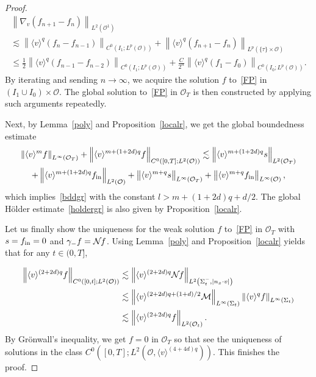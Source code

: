 \documentclass[AHL,Unicode,longabstracts,published]{cedram}
\newcommand*\fin {f_{\rm in}}
\newcommand*\M {{\mathcal{M}}}
\newcommand*\NN {{\mathcal{N}\hspace{-.3mm}}}
\newcommand*\OO {\mathcal{O}}
\newcommand{\lv}{\langle v\rangle}
\begin{document}
\begin{proof}
\begin{multline*}
\left\|\nabla_v(f_{n+1}-f_{n})\right\|_{L^2\left(\OO^1\right)} \\
\lesssim \left\|\lv^{q}(f_{n}-f_{n-1})\right\|_{C^0\left(I_1;L^p(\OO)\right)} +\left\|\lv^{q}(f_{n+1}-f_{n})\right\|_{L^p(\{\tau\}\times\OO)} \\
\le \frac{1}{2}\left\|\lv^{q} \left(f_{n-1}-f_{n-2}\right)\right\|_{C^0\left(I_1;L^p(\OO)\right)} + \frac{C}{2^n}\left\|\lv^{q} (f_{1}-f_{0})\right\|_{C^0\left(I_{0};L^p(\OO)\right)} .
\end{multline*}
By iterating and sending $n\rightarrow\infty$, we acquire the solution $f$ to~\eqref{FP} in $(I_1\cup I_0)\times\OO$. The global solution to~\eqref{FP} in $\OO_T$ is then constructed by applying such arguments repeatedly.

Next, by Lemma~\ref{poly} and Proposition~\ref{localr}, we get the global boundedness estimate
\begin{multline*}
\left\|\lv^mf\right\|_{L^\infty(\OO_T)} +\left\|\lv^{m+(1+2d)q}f\right\|_{C^0\left([0,T];L^2(\OO)\right)}
\lesssim \left\|\lv^{m+(1+2d)q}s\right\|_{L^2(\OO_T)}\\
+ \left\|\lv^{m+(1+2d)q}\fin\right\|_{L^2(\OO)} +
\left\|\lv^{m+q}s\right\|_{L^\infty(\OO_T)} + \left\|\lv^{m+q}\fin\right\|_{L^\infty(\OO)},
\end{multline*}
which implies~\eqref{bddgr} with the constant $l>m+(1+2d)q+d/2$. The global H\"older estimate~\eqref{holdergr} is also given by Proposition~\ref{localr}.

Let us finally show the uniqueness for the weak solution $f$ to~\eqref{FP} in $\OO_T$ with $s=\fin=0$ and $\gamma_-f=\NN f$. Using Lemma~\ref{poly} and Proposition~\ref{localr} yields that for any $t\in(0,T]$,

\begin{align*}
\left\|\lv^{(2+2d)q} f\right\|_{C^0\left([0,t];L^2(\OO)\right)}
&\lesssim \left\|\lv^{(2+2d)q}\NN f\right\|_{L^2\left(\Sigma_t^-,|n_x\cdot v|\right)}\\
&\lesssim \left\|\lv^{(2+2d)q+(1+d)/2}\M\right\|_{L^\infty(\Sigma_t)} \left\|\lv^{q}f\right\|_{L^\infty(\Sigma_t)}\\
&\lesssim \left\|\lv^{(2+2d)q} f\right\|_{L^2(\OO_t)}.
\end{align*}
By Gr\"onwall's inequality, we get $f=0$ in $\OO_T$ so that see the uniqueness of solutions in the class $C^0([0,T];L^2(\OO,\lv^{(4+4d)q}))$. This finishes the proof.
\end{proof}
\end{document}
